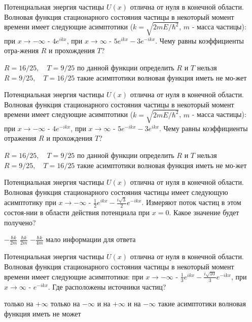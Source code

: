 \documentclass[11pt,a4paper]{exam}
\begin{document}
\begin{questions}
\question Потенциальная энергия частицы $U(x)$ отлична от нуля в конечной области. Волновая функция стационарного состояния частицы в некоторый момент времени имеет следующие асимптотики ($k = \sqrt {2mE/{\hbar ^2}} $, $m$ - масса частицы): при $x \to  - \infty $ - $4{e^{ikx}}$, при $x \to \infty $ - $5{e^{ikx}} - 3{e^{ - ikx}}$. Чему равны коэффициенты отра-жения $R$ и прохождения $T$?
\begin{choices}
\choice $R = 16/25,\quad T = 9/25$    
\choice по данной функции определить $R$ и $T$ нельзя
\choice $R = 9/25,\quad T = 16/25$    
\choice такие асимптотики волновая функция иметь не мо-жет
\end{choices}

\question Потенциальная энергия частицы $U(x)$ отлична от нуля в конечной области. Волновая функция стационарного состояния частицы в некоторый момент времени имеет следующие асимптотики ($k = \sqrt {2mE/{\hbar ^2}} $, $m$ - масса частицы): при $x \to  - \infty $ - $4{e^{ - ikx}}$, при $x \to \infty $ - $5{e^{ - ikx}} - 3{e^{ikx}}$. Чему равны коэффициенты отражения $R$ и прохождения $T$?
\begin{choices}
\choice $R = 16/25,\quad T = 9/25$    
\choice по данной функции определить $R$ и $T$ нельзя
\choice $R = 9/25,\quad T = 16/25$    
\choice такие асимптотики волновая функция иметь не мо-жет
\end{choices}

\question Потенциальная энергия частицы $U(x)$ отлична от нуля в конечной области. Волновая функция стационарного состояния частицы имеет следующую асимптотику при $x \to  - \infty $ - $\frac{1}{2}{e^{ikx}} - \frac{{i\sqrt 3 }}{2}{e^{ - ikx}}$. Измеряют поток частиц в этом состоя-нии в области действия потенциала при $x = 0$. Какое значение будет получено?
\begin{choices}
\choice $ - \frac{{\hbar k}}{{2m}}$      
\choice $\frac{{\hbar k}}{{2m}}$      
\choice $ - \frac{{\hbar k}}{{4m}}$      
\choice мало информации для ответа
\end{choices}

\question Потенциальная энергия частицы $U(x)$ отлична от нуля в конечной области. Волновая функция стационарного состояния частицы в некоторый момент времени имеет следующие асимптотики: при $x \to  - \infty $ - $\frac{1}{3}{e^{ikx}} - \frac{{i\sqrt {10} }}{3}{e^{ - ikx}}$, при $x \to \infty $ - ${e^{ - ikx}}$. Где расположены источники частиц?
\begin{choices}
\choice только на $ + \infty $        
\choice только на $ - \infty $
\choice и на $ + \infty $ и на $ - \infty $       
\choice такие асимптотики волновая функция иметь не может
\end{choices}


\end{questions}
\end{document}
